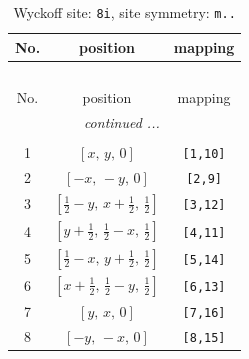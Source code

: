 \documentclass[fleqn,8pt]{jsarticle}
\begin{document}
\renewcommand{\arraystretch}{1.2}
\begin{longtable}{ccc}
\caption{Wyckoff site: {\tt 8i}, site symmetry: {\tt m..}}
 \\
 \hline \hline
No. & position & mapping \\ \hline \endfirsthead

\multicolumn{2}{l}{\tablename\ \thetable{}} \\
 \hline \hline
No. & position & mapping \\ \hline \endhead

 \hline \hline
\multicolumn{2}{r}{\footnotesize\it continued ...} \\ \endfoot

 \hline \hline
\multicolumn{2}{r}{} \\ \endlastfoot

1 & $\left[ x,\, y,\, 0 \right]$ & {\tt [1,10]} \\ \hline
2 & $\left[ - x,\, - y,\, 0 \right]$ & {\tt [2,9]} \\ \hline
3 & $\left[ \frac{1}{2} - y,\, x + \frac{1}{2},\, \frac{1}{2} \right]$ & {\tt [3,12]} \\ \hline
4 & $\left[ y + \frac{1}{2},\, \frac{1}{2} - x,\, \frac{1}{2} \right]$ & {\tt [4,11]} \\ \hline
5 & $\left[ \frac{1}{2} - x,\, y + \frac{1}{2},\, \frac{1}{2} \right]$ & {\tt [5,14]} \\ \hline
6 & $\left[ x + \frac{1}{2},\, \frac{1}{2} - y,\, \frac{1}{2} \right]$ & {\tt [6,13]} \\ \hline
7 & $\left[ y,\, x,\, 0 \right]$ & {\tt [7,16]} \\ \hline
8 & $\left[ - y,\, - x,\, 0 \right]$ & {\tt [8,15]} \\
\end{longtable}
\renewcommand{\arraystretch}{1.2}
\end{document}
